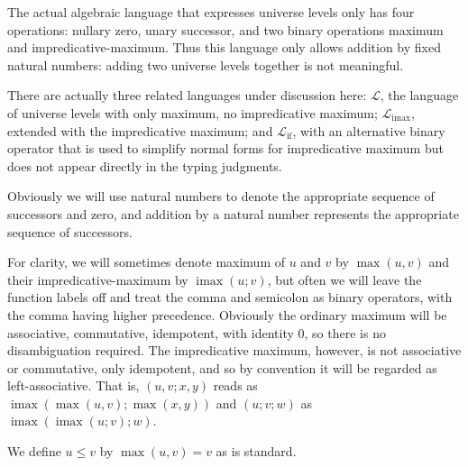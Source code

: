 \documentclass[11pt, twoside, reqno]{book}
\DeclareMathOperator{\imax}{imax}
\DeclareMathOperator{\ifop}{if}
\begin{document}
The actual algebraic language that expresses universe levels only has four operations: nullary zero, unary successor, and two binary operations maximum and impredicative-maximum.
Thus this language only allows addition by fixed natural numbers: adding two universe levels together is not meaningful.

There are actually three related languages under discussion here: \(\mathcal{L}\), the language of universe levels with only maximum, no impredicative maximum; \(\mathcal{L}_{\imax}\), extended with the impredicative maximum; and \(\mathcal{L}_{\ifop}\), with an alternative binary operator that is used to simplify normal forms for impredicative maximum but does not appear directly in the typing judgments.

Obviously we will use natural numbers to denote the appropriate sequence of successors and zero, and addition by a natural number represents the appropriate sequence of successors.

For clarity, we will sometimes denote maximum of \(u\) and \(v\) by \(\max(u, v)\) and their impredicative-maximum by \(\imax(u; v)\), but often we will leave the function labels off and treat the comma and semicolon as binary operators, with the comma having higher precedence.
Obviously the ordinary maximum will be associative, commutative, idempotent, with identity \(0\), so there is no disambiguation required.
The impredicative maximum, however, is not associative or commutative, only idempotent, and so by convention it will be regarded as left-associative.
That is, \((u, v; x, y)\) reads as \(\imax(\max(u, v); \max(x, y))\) and \((u; v; w)\) as \(\imax(\imax(u; v); w)\).

We define \(u \le v\) by \(\max(u, v) = v\) as is standard.
\end{document}
